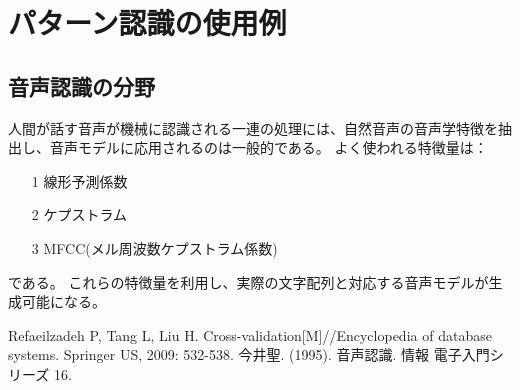 \documentclass[ %
  uplatex,%
  papersize%
]{jsarticle}
\begin{document}
\section{パターン認識の使用例}
\subsection{音声認識の分野}
人間が話す音声が機械に認識される一連の処理には、自然音声の音声学特徴を抽出し、音声モデルに応用されるのは一般的である。
よく使われる特徴量は：
\begin{itemize}
\item[1] 線形予測係数
\item[2] ケプストラム
\item[3] MFCC(メル周波数ケプストラム係数)
\end{itemize}
である。
これらの特徴量を利用し、実際の文字配列と対応する音声モデルが生成可能になる\cite{音声認識}。

\begin{thebibliography}{9}
     Refaeilzadeh P, Tang L, Liu H. Cross-validation[M]//Encyclopedia of database systems. Springer US, 2009: 532-538.
    今井聖. (1995). 音声認識. 情報 電子入門シリーズ 16.
\end{thebibliography}
\end{document}
